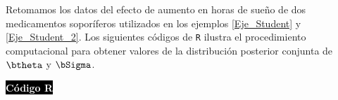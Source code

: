 \begin{Eje}\label{Eje_Student_3}
Retomamos los datos del efecto de aumento en horas de sueño de dos medicamentos soporíferos utilizados en los ejemplos \ref{Eje_Student} y \ref{Eje_Student_2}. Los siguientes códigos de \verb'R' ilustra el procedimiento computacional para obtener valores de la distribución posterior conjunta de $\btheta$ y $\bSigma$.

\colorbox{black}{\textcolor{white}{\textbf{Código R}}}
\begin{knitrout}
\color{fgcolor}\begin{kframe}
\begin{alltt}
 \hlkwb{<-} \hlstd{(}\hlstd{(}\hlstd{=sleep[}\hlopt{:}\hlstd{,}\hlstd{],} \hlstd{=sleep[}\hlopt{-}\hlstd{(}\hlopt{:}\hlstd{),}\hlstd{]))}
 \hlkwb{<-} 
 \hlkwb{<-}  \hlkwb{<-} \hlopt{*}\hlopt{-}\hlstd{)}

 \hlkwb{<-} 
 \hlkwb{<-} \hlstd{(} \hlstd{)}
 \hlkwb{<-} \hlstd{(}\hlstd{,} \hlstd{,}\hlstd{))}


\end{alltt}
\end{kframe}
\end{knitrout}
\end{Eje}
